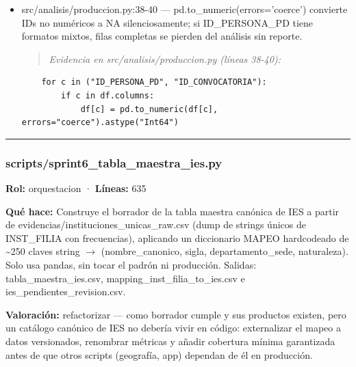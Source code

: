 \begin{itemize}
  \item src/analisis/produccion.py:38-40 --- pd.to\_numeric(errors='coerce') convierte IDs no numéricos a NA silenciosamente; si ID\_PERSONA\_PD tiene formatos mixtos, filas completas se pierden del análisis sin reporte.
\begin{quote}\footnotesize\ttfamily
\noindent\emph{Evidencia en src/analisis/produccion.py (líneas 38-40):}
\end{quote}
\begin{lstlisting}
    for c in ("ID_PERSONA_PD", "ID_CONVOCATORIA"):
        if c in df.columns:
            df[c] = pd.to_numeric(df[c], errors="coerce").astype("Int64")
\end{lstlisting}

\end{itemize}

\medskip
\hrule

\subsubsection{scripts/sprint6\_tabla\_maestra\_ies.py}
\textbf{Rol:} orquestacion · \textbf{Líneas:} 635

\textbf{Qué hace:} Construye el borrador de la tabla maestra canónica de IES a partir de evidencias/instituciones\_unicas\_raw.csv (dump de strings únicos de INST\_FILIA con frecuencias), aplicando un diccionario MAPEO hardcodeado de \textasciitilde{}250 claves string $\rightarrow$ (nombre\_canonico, sigla, departamento\_sede, naturaleza). Solo usa pandas, sin tocar el padrón ni producción. Salidas: tabla\_maestra\_ies.csv, mapping\_inst\_filia\_to\_ies.csv e ies\_pendientes\_revision.csv.

\textbf{Valoración:} refactorizar --- como borrador cumple y sus productos existen, pero un catálogo canónico de IES no debería vivir en código: externalizar el mapeo a datos versionados, renombrar métricas y añadir cobertura mínima garantizada antes de que otros scripts (geografía, app) dependan de él en producción.

